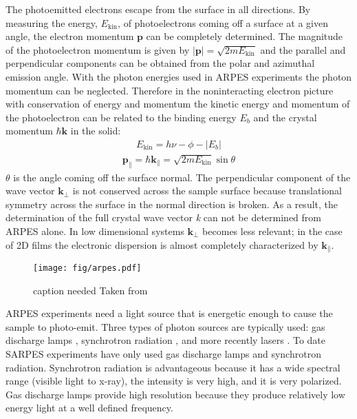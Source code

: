 \documentclass[12pt]{article}
\begin{document}
The photoemitted electrons escape from the surface in all directions.
By measuring the energy, $E_{\text{kin}}$, of photoelectrons coming off a surface at a given angle, the electron momentum $\boldsymbol{p}$ can be completely determined.
The magnitude of the photoelectron momentum is given by $|\boldsymbol{p}|=\sqrt{2mE_{\text{kin}}}$ and the parallel and perpendicular components can be obtained from the polar and azimuthal emission angle.
With the photon energies used in ARPES experiments the photon momentum can be neglected.
Therefore in the noninteracting electron picture with conservation of energy and momentum the kinetic energy and momentum of the photoelectron can be related to the binding energy $E_b$ and the crystal momentum $\hbar\boldsymbol{k}$ in the solid\cite{Damascelli}:
\begin{align}
  E_{\text{kin}}=h\nu-\phi-|E_b|
\end{align}
\begin{align}
  \boldsymbol{p_{\parallel}}=\hbar\boldsymbol{k_{\parallel}}=\sqrt{2mE_{\text{kin}}}\sin\theta
\end{align}
$\theta$ is the angle coming off the surface normal.
The perpendicular component of the wave vector $\boldsymbol{k_{\perp}}$ is not conserved across the sample surface because translational symmetry across the surface in the normal direction is broken.  
As a result, the determination of the full crystal wave vector \emph{k} can not be determined from ARPES alone.
In low dimensional systems $\boldsymbol{k_{\perp}}$ becomes less relevant; in the case of 2D films the electronic dispersion is almost completely characterized by $\boldsymbol{k_{\parallel}}$.

\begin{figure}[h]
  \centering
  \texttt{[image: fig/arpes.pdf]}
  \caption[should I put this here?]
  {caption needed Taken from \cite{Damascelli}}
  \label{fig:asymmetry}
\end{figure}
ARPES experiments need a light source that is energetic enough to cause the sample to photo-emit.
Three types of photon sources are typically used:  gas discharge lamps \cite{Damascelli}, synchrotron radiation \cite{Damascelli}, and more recently lasers \cite{Dessau}.
To date SARPES experiments have only used gas discharge lamps and synchrotron radiation.
Synchrotron radiation is advantageous because it has a wide spectral range (visible light to x-ray), the intensity is very high, and it is very polarized.
Gas discharge lamps provide high resolution because they produce relatively low energy light at a well defined frequency.
\end{document}
